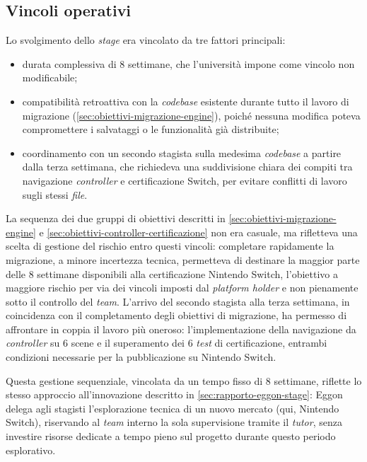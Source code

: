\subsection{Vincoli operativi}
 
Lo svolgimento dello \textit{stage} era vincolato da tre fattori principali:
 
\begin{itemize}
\item durata complessiva di 8 settimane, che l'università impone come vincolo non modificabile;
\item compatibilità retroattiva con la \textit{codebase} esistente durante tutto il lavoro di migrazione (\ref{sec:obiettivi-migrazione-engine}), poiché nessuna modifica poteva compromettere i salvataggi o le funzionalità già distribuite;
\item coordinamento con un secondo stagista sulla medesima \textit{codebase} a partire dalla terza settimana, che richiedeva una suddivisione chiara dei compiti tra navigazione \textit{controller} e certificazione Switch, per evitare conflitti di lavoro sugli stessi \textit{file}.
\end{itemize}
 
La sequenza dei due gruppi di obiettivi descritti in \ref{sec:obiettivi-migrazione-engine} e \ref{sec:obiettivi-controller-certificazione} non era casuale, ma rifletteva una scelta di gestione del rischio entro questi vincoli: completare rapidamente la migrazione, a minore incertezza tecnica, permetteva di destinare la maggior parte delle 8 settimane disponibili alla certificazione Nintendo Switch, l'obiettivo a maggiore rischio per via dei vincoli imposti dal \textit{platform holder} e non pienamente sotto il controllo del \textit{team}. L'arrivo del secondo stagista alla terza settimana, in coincidenza con il completamento degli obiettivi di migrazione, ha permesso di affrontare in coppia il lavoro più oneroso: l'implementazione della navigazione da \textit{controller} su 6 scene e il superamento dei 6 \textit{test} di certificazione, entrambi condizioni necessarie per la pubblicazione su Nintendo Switch.
 
Questa gestione sequenziale, vincolata da un tempo fisso di 8 settimane, riflette lo stesso approccio all'innovazione descritto in \ref{sec:rapporto-eggon-stage}: Eggon delega agli stagisti l'esplorazione tecnica di un nuovo mercato (qui, Nintendo Switch), riservando al \textit{team} interno la sola supervisione tramite il \textit{tutor}, senza investire risorse dedicate a tempo pieno sul progetto durante questo periodo esplorativo.


